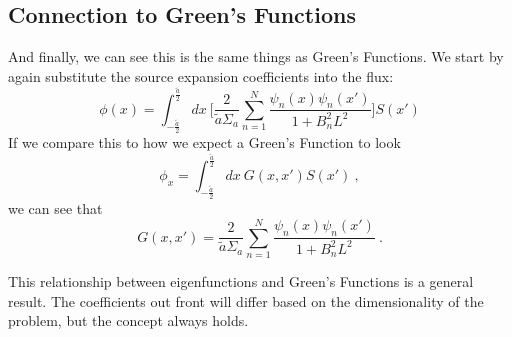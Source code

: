 \documentclass[12pt]{article}
\begin{document}
\subsection*{Connection to Green's Functions}
And finally, we can see this is the same things as Green's Functions. We start by again substitute the source expansion coefficients into the flux:
\[
\phi(x) = \int_{-\frac{\tilde{a}}{2}}^{\frac{\tilde{a}}{2}} dx\: \biggl[\frac{2}{\tilde{a} \Sigma_a} \sum_{n=1}^N \frac{\psi_n(x) \psi_n(x')}{1 + B_n^2  L^2}  \biggr] S(x')
\]
If we compare this to how we expect a Green's Function to look
\[
\phi_x = \int_{-\frac{\tilde{a}}{2}}^{\frac{\tilde{a}}{2}} dx\: G(x,x') S(x')\:,
\]
we can see that
\[
G(x,x') = \frac{2}{\tilde{a} \Sigma_a} \sum_{n=1}^N \frac{\psi_n(x) \psi_n(x')}{1 + B_n^2  L^2}\:.
\]

This relationship between eigenfunctions and Green's Functions is a general result. The coefficients out front will differ based on the dimensionality of the problem, but the concept always holds.
\end{document}
